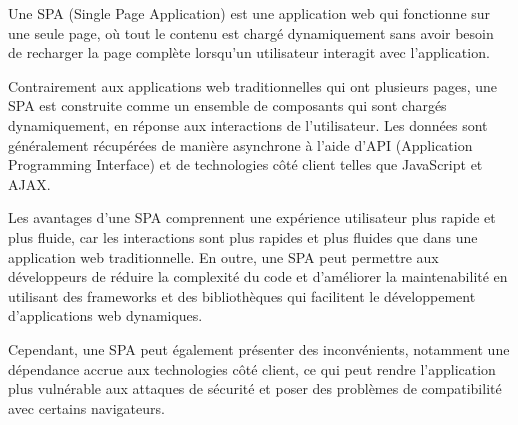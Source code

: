 Une SPA (Single Page Application) est une application web qui fonctionne sur une seule page, où tout le contenu est chargé dynamiquement sans avoir besoin de recharger la page complète lorsqu'un utilisateur interagit avec l'application.

Contrairement aux applications web traditionnelles qui ont plusieurs pages, une SPA est construite comme un ensemble de composants qui sont chargés dynamiquement, en réponse aux interactions de l'utilisateur. Les données sont généralement récupérées de manière asynchrone à l'aide d'API (Application Programming Interface) et de technologies côté client telles que JavaScript et AJAX.

Les avantages d'une SPA comprennent une expérience utilisateur plus rapide et plus fluide, car les interactions sont plus rapides et plus fluides que dans une application web traditionnelle. En outre, une SPA peut permettre aux développeurs de réduire la complexité du code et d'améliorer la maintenabilité en utilisant des frameworks et des bibliothèques qui facilitent le développement d'applications web dynamiques.

Cependant, une SPA peut également présenter des inconvénients, notamment une dépendance accrue aux technologies côté client, ce qui peut rendre l'application plus vulnérable aux attaques de sécurité et poser des problèmes de compatibilité avec certains navigateurs.